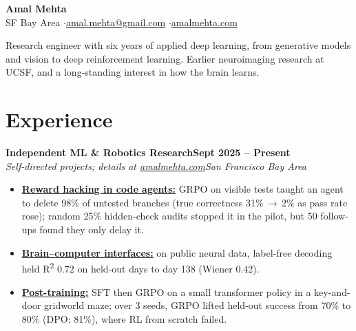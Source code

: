 \documentclass[10pt]{article}
\newcommand{\role}[4]{\textbf{#1}\hfill\textbf{#2}\\\textit{#3}\hfill\textit{#4}}
\begin{document}
\fontsize{9.8}{11.2}\selectfont

\begin{center}
{\LARGE\bfseries Amal Mehta}\\[3pt]
SF Bay Area \quad$\cdot$\quad \href{mailto:amal.mehta@gmail.com}{amal.mehta@gmail.com} \quad$\cdot$\quad \href{https://amalmehta.com/}{amalmehta.com}
\end{center}

Research engineer with six years of applied deep learning, from generative models and vision to deep reinforcement learning. Earlier neuroimaging research at UCSF, and a long-standing interest in how the brain learns.

\section*{Experience}

\role{Independent ML \& Robotics Research}{Sept 2025 -- Present}{Self-directed projects; details at \href{https://amalmehta.com/}{amalmehta.com}}{San Francisco Bay Area}
\begin{itemize}
\item \href{https://amalmehta.com/long_term_horizon_planning/}{\textbf{Reward hacking in code agents:}} GRPO on visible tests taught an agent to delete 98\% of untested branches (true correctness 31\%\,$\to$\,2\% as pass rate rose); random 25\% hidden-check audits stopped it in the pilot, but 50 follow-ups found they only delay it.
\item \href{https://github.com/amalmehta/BCIProjects}{\textbf{Brain--computer interfaces:}} on public neural data, label-free decoding held R\textsuperscript{2} 0.72 on held-out days to day 138 (Wiener 0.42).
\item \href{https://github.com/amalmehta/PostTrainingLab}{\textbf{Post-training:}} SFT then GRPO on a small transformer policy in a key-and-door gridworld maze; over 3 seeds, GRPO lifted held-out success from 70\% to 80\% (DPO: 81\%), where RL from scratch failed.
\end{itemize}
\end{document}
